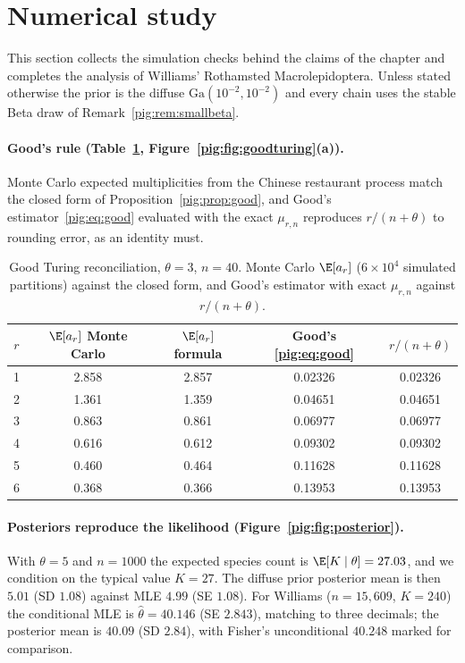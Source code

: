 \section{Numerical study}\label{pig:sec:numerical}

This section collects the simulation checks behind the claims of the chapter and completes the analysis of Williams' Rothamsted Macrolepidoptera. Unless stated otherwise the prior is the diffuse $\mathrm{Ga}(10^{-2},10^{-2})$ and every chain uses the stable Beta draw of Remark~\ref{pig:rem:smallbeta}.

\paragraph{Good's rule (Table~\ref{pig:tab:good}, Figure~\ref{pig:fig:goodturing}(a)).} Monte Carlo expected multiplicities from the Chinese restaurant process match the closed form of Proposition~\ref{pig:prop:good}, and Good's estimator~\eqref{pig:eq:good} evaluated with the exact $\mu_{r,n}$ reproduces $r/(n+\theta)$ to rounding error, as an identity must.

\begin{table}[t]
\centering
\caption{Good Turing reconciliation, $\theta=3$, $n=40$. Monte Carlo $\E[a_r]$ ($6\times10^4$ simulated partitions) against the closed form, and Good's estimator with exact $\mu_{r,n}$ against $r/(n+\theta)$.}
\label{pig:tab:good}
\small
\begin{tabular}{@{}ccccc@{}}
\toprule
$r$ & $\E[a_r]$ Monte Carlo & $\E[a_r]$ formula & Good's \eqref{pig:eq:good} & $r/(n+\theta)$\\
\midrule
1 & 2.858 & 2.857 & 0.02326 & 0.02326\\
2 & 1.361 & 1.359 & 0.04651 & 0.04651\\
3 & 0.863 & 0.861 & 0.06977 & 0.06977\\
4 & 0.616 & 0.612 & 0.09302 & 0.09302\\
5 & 0.460 & 0.464 & 0.11628 & 0.11628\\
6 & 0.368 & 0.366 & 0.13953 & 0.13953\\
\bottomrule
\end{tabular}
\end{table}

\paragraph{Posteriors reproduce the likelihood (Figure~\ref{pig:fig:posterior}).} With $\theta=5$ and $n=1000$ the expected species count is $\E[K\mid\theta]=27.03$, and we condition on the typical value $K=27$. The diffuse prior posterior mean is then $5.01$ (SD $1.08$) against MLE $4.99$ (SE $1.08$). For Williams ($n=15{,}609$, $K=240$) the conditional MLE is $\hat\theta=40.146$ (SE $2.843$), matching \citet{pig:mccullagh2016} to three decimals; the posterior mean is $40.09$ (SD $2.84$), with Fisher's unconditional $40.248$ marked for comparison.

